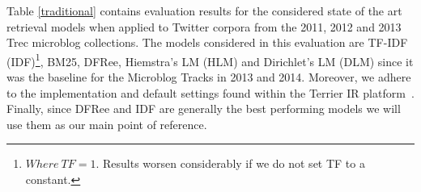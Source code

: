 Table \ref{traditional} contains evaluation results for the considered state of the art retrieval models when applied to Twitter corpora from the 2011, 2012 and 2013 Trec microblog collections. The models considered in this evaluation are TF-IDF (IDF)\footnote{\(Where~TF=1.\) Results worsen considerably if we do not set TF to a constant.}, BM25, DFRee, Hiemstra's LM (HLM) and Dirichlet's LM (DLM) since it was the baseline for the Microblog Tracks in 2013 and 2014. Moreover, we adhere to the implementation and default settings found within the Terrier IR platform~\cite{ounis2005terrier}. Finally, since DFRee and IDF are generally the best performing models we will use them as our main point of reference.



%

